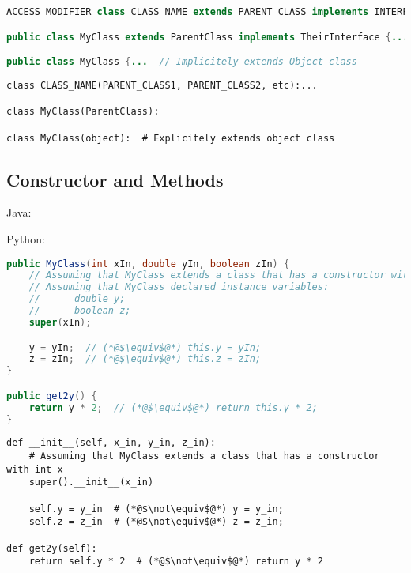 \documentclass{article}
\begin{document}
\begin{minipage}{0.45\linewidth}
    \begin{lstlisting}[language=Java]
ACCESS_MODIFIER class CLASS_NAME extends PARENT_CLASS implements INTERFACES {...

public class MyClass extends ParentClass implements TheirInterface {...

public class MyClass {...  // Implicitely extends Object class
    \end{lstlisting}
\end{minipage}
\hfill
\begin{minipage}{0.45\linewidth}
    \begin{lstlisting}
class CLASS_NAME(PARENT_CLASS1, PARENT_CLASS2, etc):...

class MyClass(ParentClass):

class MyClass(object):  # Explicitely extends object class
    \end{lstlisting}
\end{minipage}

\subsection{Constructor and Methods}
\begin{minipage}{0.45\linewidth}
    Java:
\end{minipage}
\hfill
\begin{minipage}{0.45\linewidth}
    Python:
\end{minipage}

\begin{minipage}{0.45\linewidth}
    \begin{lstlisting}[language=Java]
public MyClass(int xIn, double yIn, boolean zIn) {
    // Assuming that MyClass extends a class that has a constructor with int x
    // Assuming that MyClass declared instance variables:
    //      double y;
    //      boolean z;
    super(xIn);

    y = yIn;  // (*@$\equiv$@*) this.y = yIn;
    z = zIn;  // (*@$\equiv$@*) this.z = zIn;
}

public get2y() {
    return y * 2;  // (*@$\equiv$@*) return this.y * 2;
}
     \end{lstlisting}
\end{minipage}
\hfill
\begin{minipage}{0.45\linewidth}
    \begin{lstlisting}
def __init__(self, x_in, y_in, z_in):
    # Assuming that MyClass extends a class that has a constructor with int x
    super().__init__(x_in)

    self.y = y_in  # (*@$\not\equiv$@*) y = y_in;
    self.z = z_in  # (*@$\not\equiv$@*) z = z_in;

def get2y(self):
    return self.y * 2  # (*@$\not\equiv$@*) return y * 2
    \end{lstlisting}
\end{minipage}
\end{document}
